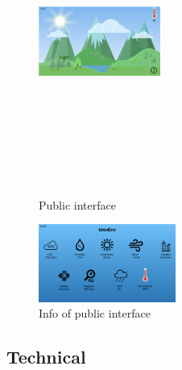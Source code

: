 \documentclass[12pt]{article} %
\begin{document}
\begin{itemize}
\begin{figure}[H]
  \centering
  \includegraphics[width=4cm,height=10cm,keepaspectratio]{img/p1.png}
  \caption{Public interface}
  \label{fig:boat1}
\end{figure}
\begin{figure}[H]
  \centering
  \includegraphics[width=0.4\textwidth]{img/p2.png}
  \caption{Info of public interface}
  \label{fig:boat2}
\end{figure}
\end{itemize}
\newpage
\subsection{Technical}
\end{document}
